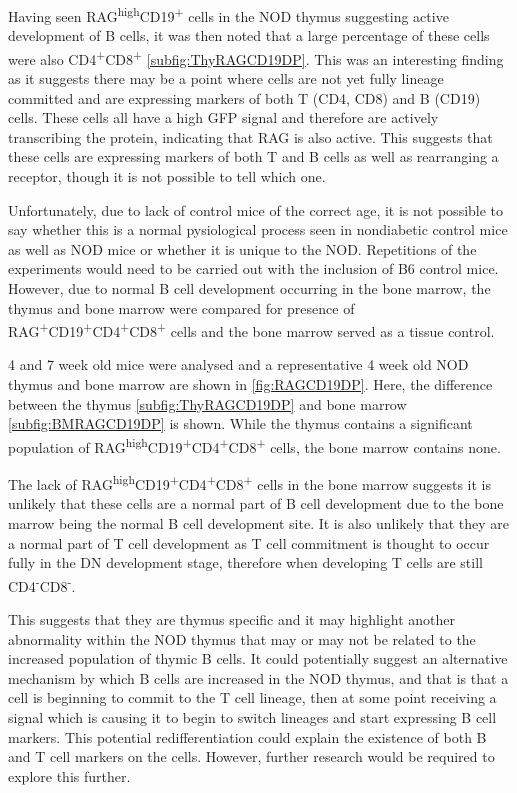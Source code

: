 Having seen RAG\textsuperscript{high}CD19\textsuperscript{+} cells in the NOD thymus suggesting active development of B cells, it was then noted that a large percentage of these cells were also CD4\textsuperscript{+}CD8\textsuperscript{+} \cref{subfig:ThyRAGCD19DP}.
This was an interesting finding as it suggests there may be a point where cells are not yet fully lineage committed and are expressing markers of both T (CD4, CD8) and B (CD19) cells.
These cells all have a high GFP signal and therefore are actively transcribing the protein, indicating that RAG is also active.
This suggests that these cells are expressing markers of both T and B cells as well as rearranging a receptor, though it is not possible to tell which one.

Unfortunately, due to lack of control mice of the correct age, it is not possible to say whether this is a normal pysiological process seen in nondiabetic control mice as well as NOD mice or whether it is unique to the NOD.
Repetitions of the experiments would need to be carried out with the inclusion of B6 control mice.
However, due to normal B cell development occurring in the bone marrow, the thymus and bone marrow were compared for presence of RAG\textsuperscript{+}CD19\textsuperscript{+}CD4\textsuperscript{+}CD8\textsuperscript{+} cells and the bone marrow served as a tissue control.

4 and 7 week old mice were analysed and a representative 4 week old NOD thymus and bone marrow are shown in \cref{fig:RAGCD19DP}. 
Here, the difference between the thymus \cref{subfig:ThyRAGCD19DP} and bone marrow \cref{subfig:BMRAGCD19DP} is shown.
While the thymus contains a significant population of RAG\textsuperscript{high}CD19\textsuperscript{+}CD4\textsuperscript{+}CD8\textsuperscript{+} cells, the bone marrow contains none.

The lack of RAG\textsuperscript{high}CD19\textsuperscript{+}CD4\textsuperscript{+}CD8\textsuperscript{+} cells in the bone marrow suggests it is unlikely that these cells are a normal part of B cell development due to the bone marrow being the normal B cell development site.
It is also unlikely that they are a normal part of T cell development as T cell commitment is thought to occur fully in the DN development stage, therefore when developing T cells are still CD4\textsuperscript{-}CD8\textsuperscript{-}.

This suggests that they are thymus specific and it may highlight another abnormality within the NOD thymus that may or may not be related to the increased population of thymic B cells.
It could potentially suggest an alternative mechanism by which B cells are increased in the NOD thymus, and that is that a cell is beginning to commit to the T cell lineage, then at some point receiving a signal which is causing it to begin to switch lineages and start expressing B cell markers.
This potential redifferentiation could explain the existence of both B and T cell markers on the cells. 
However, further research would be required to explore this further.


